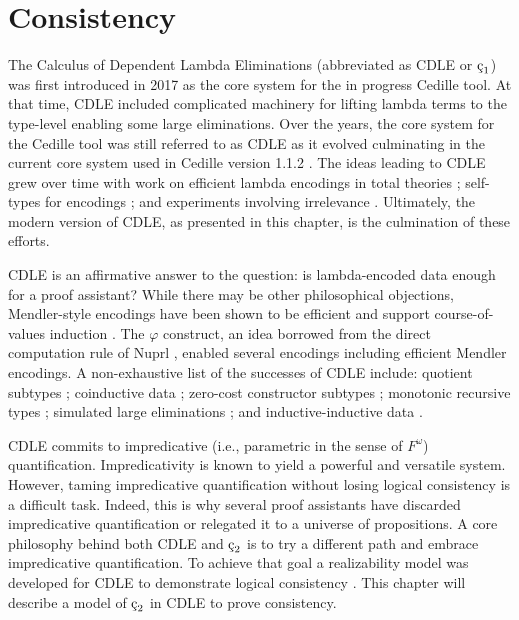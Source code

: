 \chapter{Consistency}




\newcommand{\cBool}{\textnormal{Bool}}
\newcommand{\ctt}{\textnormal{tt}}
\newcommand{\cff}{\textnormal{ff}}

\newcommand{\cId}{\textnormal{Id}}
\newcommand{\crefl}{\textnormal{refl}}
\newcommand{\ctheta}{\textnormal{theta}}
\newcommand{\csubst}{\textnormal{subst}}
\newcommand{\cdelta}{\textnormal{delta}}
\newcommand{\cirrel}{\textnormal{irrel}}

The Calculus of Dependent Lambda Eliminations (abbreviated as CDLE or $\oldced$) was first introduced in 2017 \cite{stump2017_cdle} as the core system for the in progress Cedille tool.
At that time, CDLE included complicated machinery for lifting lambda terms to the type-level enabling some large eliminations.
Over the years, the core system for the Cedille tool was still referred to as CDLE as it evolved culminating in the current core system used in Cedille version 1.1.2 \cite{stump2021_cedillecore}.
The ideas leading to CDLE grew over time with work on efficient lambda encodings in total theories \cite{stump2016_encodings}; self-types for encodings \cite{fu2014self}; and experiments involving irrelevance \cite{sjoberg2012irrelevance,sjoberg2011equality}.
Ultimately, the modern version of CDLE, as presented in this chapter, is the culmination of these efforts.

CDLE is an affirmative answer to the question: is lambda-encoded data enough for a proof assistant?
While there may be other philosophical objections, Mendler-style encodings have been shown to be efficient and support course-of-values induction \cite{firsov2018_mendler,firsov2018course}.
The $\varphi$ construct, an idea borrowed from the direct computation rule of Nuprl \cite{allen2000}, enabled several encodings including efficient Mendler encodings.
A non-exhaustive list of the successes of CDLE include: quotient subtypes \cite{marmaduke2020quotients}; coinductive data \cite{jenkins2020efficient}; zero-cost constructor subtypes \cite{marmaduke2020_constructor_subtyping}; monotonic recursive types \cite{jenkins2021monotone}; simulated large eliminations \cite{jenkins2021_large_elim}; and inductive-inductive data \cite{marmaduke2023_indind}.

CDLE commits to impredicative (i.e., parametric in the sense of $F^\omega$) quantification.
Impredicativity is known to yield a powerful and versatile system.
However, taming impredicative quantification without losing logical consistency is a difficult task.
Indeed, this is why several proof assistants have discarded impredicative quantification or relegated it to a universe of propositions.
A core philosophy behind both CDLE and $\ced$ is to try a different path and embrace impredicative quantification.
To achieve that goal a realizability model was developed for CDLE to demonstrate logical consistency \cite{stump2021_cedillecore}.
This chapter will describe a model of $\ced$ in CDLE to prove consistency.

